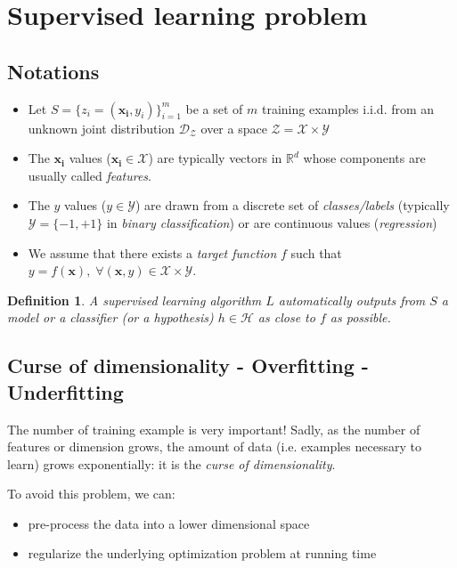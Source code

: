 \documentclass{article}
\newtheorem{defi}{Definition}
\begin{document}
\section{Supervised learning problem}
\subsection{Notations}
\begin{itemize}
\item Let $S =\{ z_i = (\mathbf{x_i},y_i)\}^m_{i=1}$ be a set of $m$ training examples i.i.d. from an unknown joint distribution $\mathcal{D}_{\mathcal{Z}}$ over a space $\mathcal{Z} = \mathcal{X} \times \mathcal{Y}$

\item The $\mathbf{x_i}$ values ($\mathbf{x_i} \in \mathcal{X}$) are typically vectors in $\mathbb{R}^d$ whose components are usually called \emph{features}.

\item The $y$ values ($y \in \mathcal{Y}$) are drawn from a discrete set of \emph{classes/labels} (typically $\mathcal{Y}=\{-1,+1\}$ in \emph{binary classification}) or are continuous values (\emph{regression})

\item We assume that there exists a \emph{target function} $f$ such that $y=f(\mathbf{x}), \; \forall (\mathbf{x},y) \in \mathcal{X} \times \mathcal{Y}$.
\end{itemize}

\begin{defi}
A supervised learning algorithm $L$ automatically outputs from $S$ a model or a classifier (or a hypothesis) $h\in \mathcal{H}$ as close to $f$ as possible.
\end{defi}

\subsection{Curse of dimensionality - Overfitting - Underfitting}
The number of training example is very important! Sadly, as the number of features or dimension grows, the amount of data (i.e. examples necessary to learn) grows exponentially: it is the \emph{curse of dimensionality}.

To avoid this problem, we can:
\begin{itemize}
\item pre-process the data into a lower dimensional space
\item regularize the underlying optimization problem at running time
\end{itemize}
\end{document}
